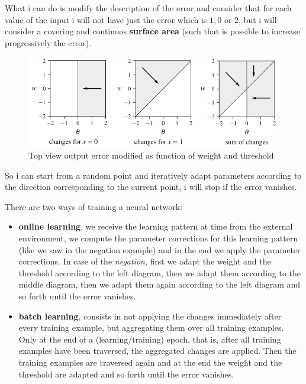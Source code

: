 \documentclass{article}
\begin{document}
What i can do is modify the description of the error and consider that for each value
of the input i will not have just the error which is $1,0$ or $2$, but i will consider
a covering and continuos \textbf{surface area} (such that is possible to increase progressively
the error).

\begin{figure}[H]
    \includegraphics[scale=0.6]{images/desc_2_of_error_topview.png}
    \centering
    \caption{Top view output error modified as function of weight and threshold}
\end{figure}

So i can start from a random point and iteratively adapt parameters according to the direction
corresponding to the current point, i will stop if the error vanishes.

There are two ways of training a neural network:
\begin{itemize}
    \item \textbf{online learning}, we receive the learning pattern at time from the
          external environment, we compute the parameter corrections for this learning pattern (like
          we saw in the negation example) and in the end we apply the parameter corrections. In
          case of the \textit{negation}, first we adapt the weight and the threshold according to the left diagram,
          then we adapt them according to the middle diagram, then we adapt them again
          according to the left diagram and so forth until the error vanishes.

    \item \textbf{batch learning}, consists in not applying the changes immediately after every
          training example, but aggregating them over all training examples. Only at the end of
          a (learning/training) epoch, that is, after all training examples have been traversed,
          the aggregated changes are applied. Then the training examples are traversed again
          and at the end the weight and the threshold are adapted and so forth until the error
          vanishes.
\end{itemize}
\end{document}
